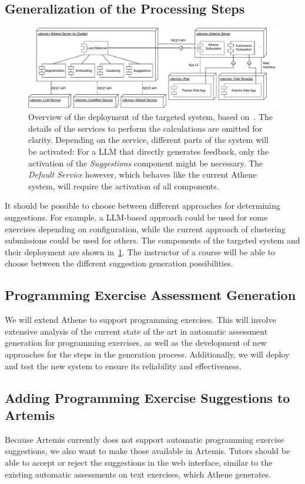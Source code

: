\subsection*{Generalization of the Processing Steps}
\begin{figure}[ht]
    \centering
    \includegraphics[width=\linewidth]{figures/proposal/deployment.pdf}
    \caption{Overview of the deployment of the targeted system, based on~\cite{atheneLoadBalancer}. The details of the services to perform the calculations are omitted for clarity. Depending on the service, different parts of the system will be activated: For a LLM that directly generates feedback, only the activation of the \textit{Suggestions} component might be necessary. The \textit{Default Service} however, which behaves like the current Athene system, will require the activation of all components.}
    \label{fig:deployment}
\end{figure}
It should be possible to choose between different approaches for determining suggestions. For example, a LLM-based approach could be used for some exercises depending on configuration, while the current approach of clustering submissions could be used for others. The components of the targeted system and their deployment are shown in~\cref{fig:deployment}. The instructor of a course will be able to choose between the different suggestion generation possibilities.

\subsection*{Programming Exercise Assessment Generation}
We will extend Athene to support programming exercises. This will involve extensive analysis of the current state of the art in automatic assessment generation for programming exercises, as well as the development of new approaches for the steps in the generation process. Additionally, we will deploy and test the new system to ensure its reliability and effectiveness.

\subsection*{Adding Programming Exercise Suggestions to Artemis}
Because Artemis currently does not support automatic programming exercise suggestions, we also want to make those available in Artemis. Tutors should be able to accept or reject the suggestions in the web interface, similar to the existing automatic assessments on text exercises, which Athene generates. 

